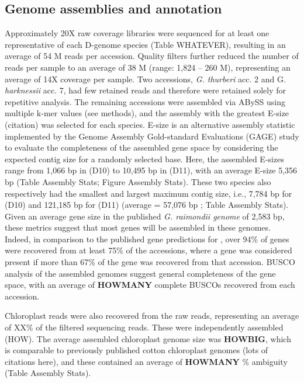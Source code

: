 \documentclass{bmcart}
\newcommand{\note}[2][]{\added[id=#1,remark={#2}]{}}
\begin{document}
\subsection*{Genome assemblies and annotation}
Approximately 20X raw coverage libraries \note[Corrinne]{update numbers} were sequenced for at least one representative of each D-genome species (Table WHATEVER), resulting in an average of 54 M \note[Corrinne]{update numbers} reads per accession. Quality filters further reduced the number of reads per sample to an average of 38 M (range: 1,824 – 260 M\note[Corrinne]{update numbers}), representing an average of 14X coverage per sample\note[Corrinne]{update numbers}. Two accessions, \textit{G. thurberi} acc. 2 and G. \textit{harknessii} acc. 7, had few retained reads and therefore were retained solely for repetitive analysis.  The remaining accessions were assembled via ABySS using multiple k-mer values (see methods), and the assembly with the greatest E-size (citation) was selected for each species. E-size is an alternative assembly statistic implemented by the Genome Assembly Gold-standard Evaluations (GAGE) study to evaluate the completeness of the assembled gene space by considering the expected contig size for a randomly selected base. Here, the assembled E-sizes range from 1,066 bp in (D10) \note[Corrinne]{update now that D10 has better sequence} to 10,495 bp in (D11), with an average E-size 5,356 bp (Table Assembly Stats; Figure Assembly Stats). These two species also respectively had the smallest and largest maximum contig size, i.e., 7,784 bp for (D10) \note[Corrinne]{update} and 121,185 bp for (D11) (average = 57,076 bp \note[Corrinne]{update numbers}; Table Assembly Stats). Given an average gene size in the published \textit{G. raimondii genome} of 2,583 bp, these metrics suggest that most genes will be assembled in these genomes. Indeed, in comparison to the published gene predictions for \note[Corrinne]{update numbers}, over 94\% of genes were recovered from at least 75\% of the accessions, where a gene was considered present if more than 67\% of the gene was recovered from that accession. BUSCO analysis of the assembled genomes suggest general completeness of the gene space, with an average of \textbf{HOWMANY} complete BUSCOs recovered from each accession.

Chloroplast reads were also recovered from the raw reads, representing an average of XX\% \note[Corrinne]{include numbers} of the filtered sequencing reads.  These were independently assembled (HOW). The average assembled chloroplast genome size was \textbf{HOWBIG}, which is comparable to previously published cotton chloroplast genomes (lots of citations here), and these contained an average of \textbf{HOWMANY} \% ambiguity \note[Corrinne]{\% N} (Table Assembly Stats).
\end{document}
